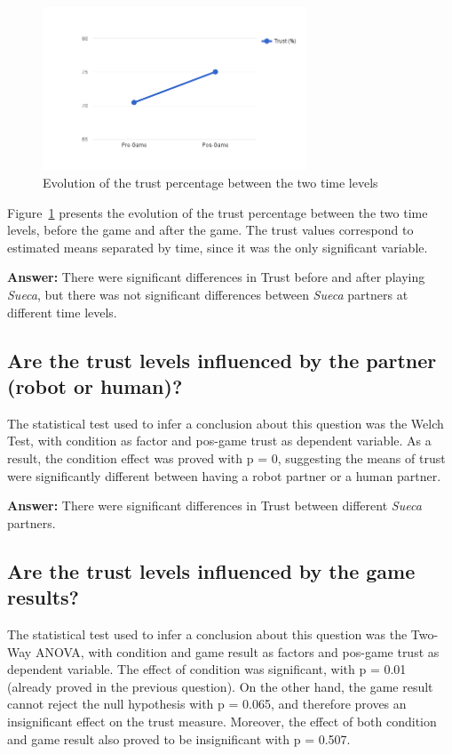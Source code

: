 \begin{figure}[h!]
  \centering
    \includegraphics[width=0.7\textwidth]{./img/6/trustMixedANOVA}
  \caption{Evolution of the trust percentage between the two time levels}
\label{fig:trustMixedANOVA}
\end{figure}

Figure~\ref{fig:trustMixedANOVA} presents the evolution of the trust percentage between the two time levels, before the game and after the game.
The trust values correspond to estimated means separated by time, since it was the only significant variable.

\textbf{Answer:} There were significant differences in Trust before and after playing \emph{Sueca}, but there was not significant differences between \emph{Sueca} partners at different time levels.



\subsection*{Are the trust levels influenced by the partner (robot or human)?}
The statistical test used to infer a conclusion about this question was the Welch Test, with condition as factor and pos-game trust as dependent variable.
As a result, the condition effect was proved with p = 0, suggesting the means of trust were significantly different between having a robot partner or a human partner.

\textbf{Answer:} There were significant differences in Trust between different \emph{Sueca} partners.


\subsection*{Are the trust levels influenced by the game results?}
The statistical test used to infer a conclusion about this question was the Two-Way ANOVA, with condition and game result as factors and pos-game trust as dependent variable.
The effect of condition was significant, with p = 0.01 (already proved in the previous question).
On the other hand, the game result cannot reject the null hypothesis with p = 0.065, and therefore proves an insignificant effect on the trust measure.
Moreover, the effect of both condition and game result also proved to be insignificant with p = 0.507.

